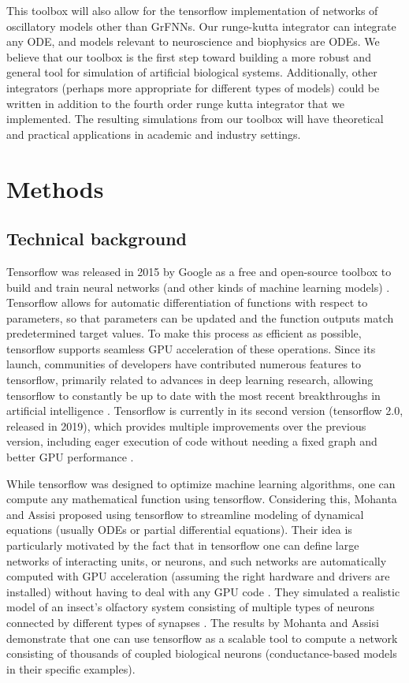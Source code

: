 \documentclass{report}
\begin{document}
This toolbox will also allow for the tensorflow implementation of networks of oscillatory models other than GrFNNs. Our runge-kutta integrator can integrate any ODE, and models relevant to neuroscience and biophysics are ODEs. We believe that our toolbox is the first step toward building a more robust and general tool for simulation of artificial biological systems. Additionally, other integrators (perhaps more appropriate for different types of models) could be written in addition to the fourth order runge kutta integrator that we implemented. The resulting simulations from our toolbox will have theoretical and practical applications in academic and industry settings. 

\section{Methods}

\subsection{Technical background}

Tensorflow was released in 2015 by Google as a free and open-source toolbox to build and train neural networks (and other kinds of machine learning models) \cite{abadi2016tensorflow}. Tensorflow allows for automatic differentiation of functions with respect to parameters, so that parameters can be updated and the function outputs match predetermined target values. To make this process as efficient as possible, tensorflow supports seamless GPU acceleration of these operations. Since its launch, communities of developers have contributed numerous features to tensorflow, primarily related to advances in deep learning research, allowing tensorflow to constantly be up to date with the most recent breakthroughs in artificial intelligence \cite{abadi2016tensorflow}. Tensorflow is currently in its second version (tensorflow 2.0, released in 2019), which provides multiple improvements over the previous version, including eager execution of code without needing a fixed graph and better GPU performance \cite{campesato2019tensorflow}.

While tensorflow was designed to optimize machine learning algorithms, one can compute any mathematical function using tensorflow. Considering this, Mohanta and Assisi \cite{mohanta2019parallel} proposed using tensorflow to streamline modeling of dynamical equations (usually ODEs or partial differential equations). Their idea is particularly motivated by the fact that in tensorflow one can define large networks of interacting units, or neurons, and such networks are automatically computed with GPU acceleration (assuming the right hardware and drivers are installed) without having to deal with any GPU code \cite{mohanta2019parallel}. They simulated a realistic model of an insect's olfactory system consisting of multiple types of neurons connected by different types of synapses \cite{mohanta2019parallel}. The results by Mohanta and Assisi \cite{mohanta2019parallel} demonstrate that one can use tensorflow as a scalable tool to compute a network consisting of thousands of coupled biological neurons (conductance-based models in their specific examples).
\end{document}

